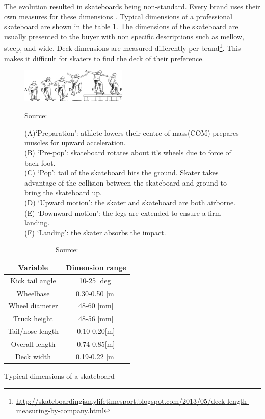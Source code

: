 The evolution resulted in skateboards being non-standard. Every brand uses their own measures for these dimensions \cite{berger_handmade_2021}. Typical dimensions of a professional skateboard are shown in the table \ref{tab:dimensions}. The dimensions of the skateboard are usually presented to the buyer with non specific descriptions such as mellow, steep, and wide. Deck dimensions are measured differently per brand\footnote{\url{http://skateboardingismylifetimesport.blogspot.com/2013/05/deck-length-measuring-by-company.html}}. This makes it difficult for skaters to find the deck of their preference.
\begin{figure}[t]
    \centering
        \includegraphics[width = 0.45\textwidth]{figure/f_ollie.png}
        \caption*{\centering \footnotesize Source: \cite{frederick_biomechanics_2006}}
        \caption[Ollie phases]{\footnotesize{(A)`Preparation': athlete lowers their centre of mass(COM) prepares muscles for upward acceleration. \\
        (B) `Pre-pop': skateboard rotates about it's wheels due to force of back foot. \\
        (C) `Pop': tail of the skateboard hits the ground. Skater takes advantage of the collision between the skateboard and ground to bring the skateboard up. \\
        (D) `Upward motion': the skater and skateboard are both airborne. \\
        (E) `Downward motion': the legs are extended to ensure a firm landing. \\
        (F) `Landing': the skater absorbs the impact. }}
        \label{fig:ollie}
\end{figure}

\begin{table}[b]
\begin{center} \label{table:dimensions}
\begin{tabular}{||c c||} 
 \hline
 Variable & Dimension range \\ [0.5ex] 
 \hline\hline
 Kick tail angle & 10-25 [deg]\\ 
 \hline
 Wheelbase & 0.30-0.50 [m]\\
 \hline
 Wheel diameter  & 48-60 [mm] \\
 \hline
 Truck height & 48-56 [mm] \\ 
 \hline
 Tail/nose length & 0.10-0.20[m] \\
 \hline
 Overall length & 0.74-0.85[m] \\
 \hline 
 Deck width& 0.19-0.22 [m] \\ [1ex] 
 \hline
\end{tabular}
\end{center}
    \caption[Typical dimension of a skateboard]{\centering Typical dimensions of a skateboard}
    \caption*{\centering \footnotesize Source: \cite{berger_handmade_2021}}
    \label{tab:dimensions}
\end{table}

